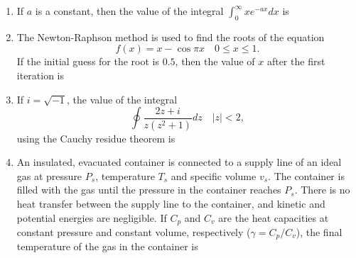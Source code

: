 \documentclass[journal,12pt,onecolumn]{IEEEtran}
\theoremstyle{remark}
\begin{document}
\begin{enumerate}
\item If $a$ is a constant, then the value of the integral $\int_{0}^{\infty} x e^{-ax} dx$ is
\hfill{}
\begin{enumerate}
\end{enumerate}

\item The Newton-Raphson method is used to find the roots of the equation
\[f(x) = x - \cos \pi x \quad 0 \leq x \leq 1.\]
If the initial guess for the root is $0.5$, then the value of $x$ after the first iteration is
\hfill{}
\begin{enumerate}
\end{enumerate}

\item If $i = \sqrt{-1}$, the value of the integral
\[\oint \frac{2z + i}{z(z^2 + 1)} dz \quad |z| < 2,\]
using the Cauchy residue theorem is
\hfill{}
\begin{enumerate}
\end{enumerate}

\item An insulated, evacuated container is connected to a supply line of an ideal gas at pressure $P_s$, temperature $T_s$ and specific volume $v_s$. The container is filled with the gas until the pressure in the container reaches $P_s$. There is no heat transfer between the supply line to the container, and kinetic and potential energies are negligible. If $C_p$ and $C_v$ are the heat capacities at constant pressure and constant volume, respectively ($\gamma = C_p/C_v$), the final temperature of the gas in the container is
\hfill{}
\begin{enumerate}
\end{enumerate}


\end{enumerate}
\end{document}
